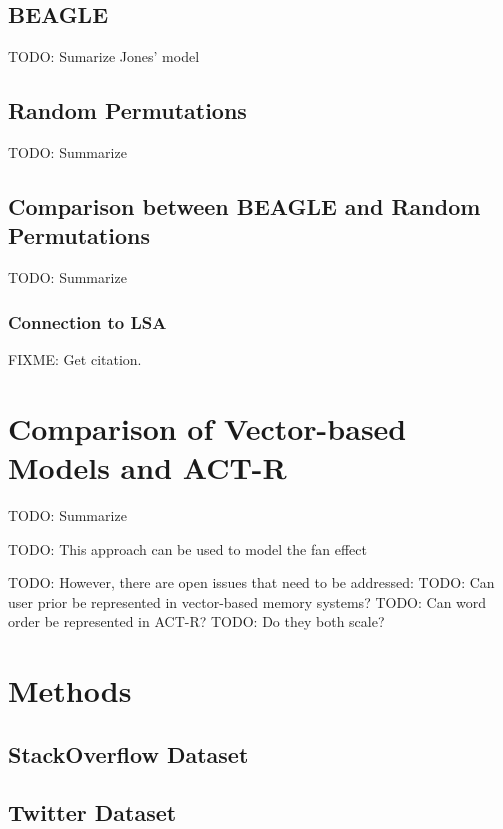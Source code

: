\documentclass[man]{apa6}
\begin{document}
\subsection{BEAGLE}

TODO: Sumarize Jones' model \cite{Jones2007}

\subsection{Random Permutations}

TODO: Summarize \cite{Sahlgren2008}

\subsection{Comparison between BEAGLE and Random Permutations}

TODO: Summarize \cite{Recchia2010}

\subsubsection{Connection to LSA}

FIXME: Get citation.

\section{Comparison of Vector-based Models and ACT-R}

TODO: Summarize \cite{Rutledge2007}

TODO: This approach can be used to model the fan effect \cite{Rutledge2008} 

TODO: However, there are open issues that need to be addressed:
TODO: Can user prior be represented in vector-based memory systems?
TODO: Can word order be represented in ACT-R?
TODO: Do they both scale?

\section{Methods}

\subsection{StackOverflow Dataset}

\cite{DataDump2013}

\subsection{Twitter Dataset}
\end{document}
